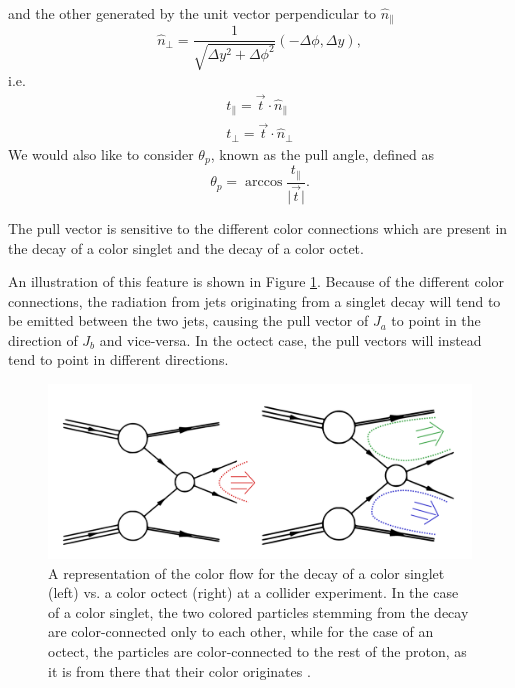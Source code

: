 \documentclass[10pt,a4paper]{book}
\begin{document}
and the other generated by the unit vector perpendicular to $\hat{n}_\parallel$
\begin{equation}
\hat{n}_\perp = \frac{1}{\sqrt{\Delta y^2 + \Delta \phi^2}}\left(-\Delta \phi, \Delta y \right),
\end{equation}
i.e.\
\begin{gather}
t_\parallel = \vec{t}\cdot \hat{n}_\parallel \\
t_\perp = \vec{t}\cdot \hat{n}_\perp
\end{gather}
We would also like to consider $\theta_{p}$, known as the pull angle, defined as
\begin{equation}
\theta_p = \arccos \frac{t_\parallel}{\vert \vec{t} \vert}.
\end{equation} 

The pull vector is sensitive to the different color connections which are present in the decay of a color singlet and the decay of a color octet.

 An illustration of this feature is shown in Figure \ref{color connections}. Because of the different color connections, the radiation from jets originating from a singlet decay will tend to be emitted between the two jets, causing the pull vector of $J_a$ to point in the direction of $J_b$ and vice-versa. In the octect case, the pull vectors will instead tend to point in different directions.
\begin{figure}[ht]
\centering
\includegraphics[scale=0.2]{ch4_images/color_configurations}
\caption{A representation of the color flow for the decay of a color singlet (left) vs. a color octect (right) at a collider experiment. In the case of a color singlet, the two colored particles stemming from the decay are color-connected only to each other, while for the case of an octect, the particles are color-connected to the rest of the proton, as it is from there that their color originates \cite{Gallicchio:2010sw}.}
\label{color connections}
\end{figure}
\end{document}
